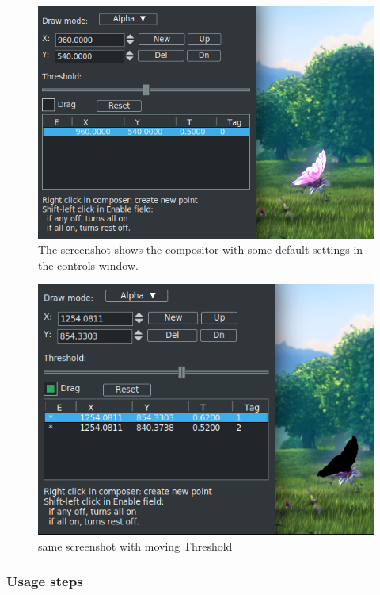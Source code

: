 \begin{figure}[htpb]
    \centering
    \includegraphics[width=0.8\linewidth]{images/crikey01.png}
    \caption{The screenshot shows the compositor with some default settings in the controls window.}
    \label{fig:crikey01}
\end{figure}

\begin{figure}[htpb]
    \centering
    \includegraphics[width=0.8\linewidth]{images/crikey02.png}
    \caption{same screenshot with moving Threshold}
    \label{fig:crikey02}
\end{figure}

\subsubsection*{Usage steps}
\label{ssub:usage_steps}


